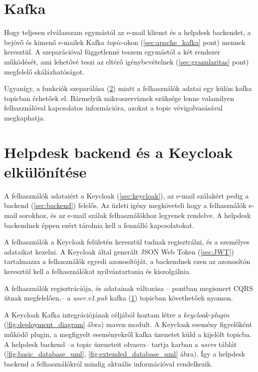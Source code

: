 \section{Kafka}\label{sec:implementacio_kafka}
Hogy teljesen elválasszam egymástól az e-mail klienst és a helpdesk backendet, a bejövő és kimenő e-mailek Kafka \textit{topic}-okon (\ref{sec:apache_kafka} pont) mennek keresztül. A szeparációval függetlenné teszem egymástól a két rendszer működését, ami lehetővé teszi az eltérő igénybevételnek (\ref{sec:granularitas} pont) megfelelő skálázhatóságot.

Ugyanígy, a funkciók szeparálása (\ref{sec:backend_keycloak_separation}) miatt a felhasználók adatai egy külön kafka topicban érhetőek el. Bármelyik mikroszerviznek szüksége lenne valamilyen felhasználóval kapcsolatos információra, azokat a topic vévigolvasásával megkaphatja.



\section{Helpdesk backend és a Keycloak elkülönítése}\label{sec:backend_keycloak_separation}
A felhasználók adataiért a Keycloak (\ref{sec:keycloak}), az e-mail szálakért pedig a backend (\ref{sec:backend}) felelős. Az üzleti igény megköveteli hogy a felhasználók e-mail sorokhoz, és az e-mail szálak felhasználókhoz legyenek rendelve. A helpdesk backendnek éppen ezért tárolnia kell a fennálló kapcsolatokat.

A felhasználók a Keycloak felületén keresztül tudnak regisztrálni, és a személyes adataikat kezelni. A Keycloak által generált JSON Web Token (\ref{sec:JWT}) tartalmazza a felhasználók egyedi azonosítóját, a backendnek ezen az azonosítón keresztül kell a felhasználókat nyilvántartania és kiszolgálnia.

A felhasználók regisztrációja, és adatainak változása -- pontban megismert CQRS útnak megfelelően,-- a \textit{user.v1.pub} kafka (\ref{sec:implementacio_kafka}) topicban követhetőek nyomon.

A Keycloak Kafka integrációjának céljából hoztam létre a \textit{keycloak-plugin} (\ref{fig:deployment_diagram} ábra) maven modult. A Keycloak esemény figyelőként működő plugin, a megfigyelt eseményekről kafka üzenetet küld a kijelölt topicba. A helpdesk backend --a topic üzeneteit olvasva-- tartja karban a \textit{users} táblát (\ref{fig:basic_database_uml}, \ref{fig:extended_database_uml} ábra). Így a helpdesk backend a felhasználókról mindig aktuális információval rendelkezik.


